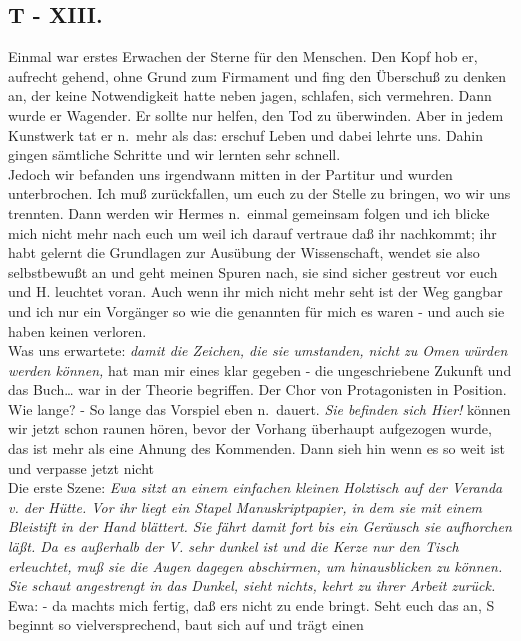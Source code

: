 \documentclass[
]{article}
\author{}
\date{\vspace{-2.5em}}
\begin{document}
\subsection{T - XIII.}\label{t---xiii.}

Einmal war erstes Erwachen der Sterne für den Menschen. Den Kopf hob er,
aufrecht gehend, ohne Grund zum Firmament und fing den Überschuß zu
denken an, der keine Notwendigkeit hatte neben jagen, schlafen, sich
vermehren. Dann wurde er Wagender. Er sollte nur helfen, den Tod zu
überwinden. Aber in jedem Kunstwerk tat er n.~mehr als das: erschuf
Leben und dabei lehrte uns. Dahin gingen sämtliche Schritte und wir
lernten sehr schnell.\\
Jedoch wir befanden uns irgendwann mitten in der Partitur und wurden
unterbrochen. Ich muß zurückfallen, um euch zu der Stelle zu bringen, wo
wir uns trennten. Dann werden wir Hermes n.~einmal gemeinsam folgen und
ich blicke mich nicht mehr nach euch um weil ich darauf vertraue daß ihr
nachkommt; ihr habt gelernt die Grundlagen zur Ausübung der
Wissenschaft, wendet sie also selbstbewußt an und geht meinen Spuren
nach, sie sind sicher gestreut vor euch und H. leuchtet voran. Auch wenn
ihr mich nicht mehr seht ist der Weg gangbar und ich nur ein Vorgänger
so wie die genannten für mich es waren - und auch sie haben keinen
verloren.\\
Was uns erwartete: \emph{damit die Zeichen, die sie umstanden, nicht zu
Omen würden werden können,} hat man mir eines klar gegeben - die
ungeschriebene Zukunft und das Buch\ldots{} war in der Theorie
begriffen. Der Chor von Protagonisten in Position. Wie lange? - So lange
das Vorspiel eben n.~dauert. \emph{Sie befinden sich Hier!} können wir
jetzt schon raunen hören, bevor der Vorhang überhaupt aufgezogen wurde,
das ist mehr als eine Ahnung des Kommenden. Dann sieh hin wenn es so
weit ist und verpasse jetzt nicht\\
Die erste Szene: \emph{Ewa sitzt an einem einfachen kleinen Holztisch
auf der Veranda v. der Hütte. Vor ihr liegt ein Stapel Manuskriptpapier,
in dem sie mit einem Bleistift in der Hand blättert. Sie fährt damit
fort bis ein Geräusch sie aufhorchen läßt. Da es außerhalb der V. sehr
dunkel ist und die Kerze nur den Tisch erleuchtet, muß sie die Augen
dagegen abschirmen, um hinausblicken zu können. Sie schaut angestrengt
in das Dunkel, sieht nichts, kehrt zu ihrer Arbeit zurück. }\\
Ewa: - da machts mich fertig, daß ers nicht zu ende bringt. Seht euch
das an, S beginnt so vielversprechend, baut sich auf und trägt einen
\end{document}

